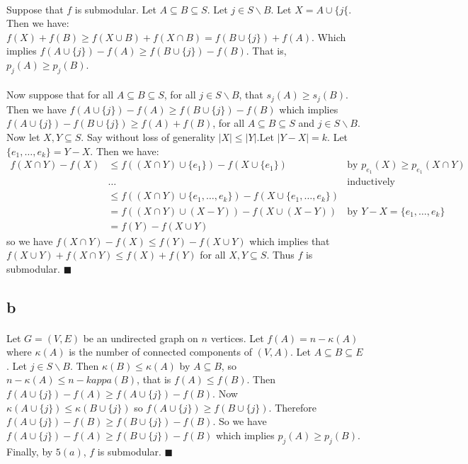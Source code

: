 \documentclass[letterpaper,12pt,oneside,onecolumn]{report}
\begin{document}
\paragraph{}
Suppose that $f$ is submodular. Let $A \subseteq B \subseteq S$. Let $j \in S \backslash B$. Let $X = A \cup \{j \{$. Then we have: $f(X) + f(B) \geq f(X \cup B) + f(X \cap B) = f(B \cup \{j\}) + f(A)$. Which implies $f(A \cup \{j\}) - f(A) \geq f(B \cup \{j\}) - f(B)$. That is, $p_j(A) \geq p_j(B)$.
\paragraph{}
Now suppose that for all $A \subseteq B \subseteq S$, for all $j \in S \backslash B$, that $s_j(A) \geq s_j(B)$. Then we have $f(A \cup \{j\}) - f(A) \geq f(B \cup \{j\}) - f(B)$ which implies $f(A \cup \{j\}) - f(B \cup \{j\}) \geq f(A) + f(B)$, for all $A \subseteq B \subseteq S$ and $j \in S \backslash B$. Now let $X, Y \subseteq S$. Say without loss of generality $|X| \leq |Y|$.Let $|Y - X| = k$. Let $\{e_1, \dots, e_k\} = Y-X$. Then we have:
\begin{align*}
f(X \cap Y) - f(X) &\leq f((X \cap Y) \cup \{e_1\}) - f(X \cup \{e_1\}) &\text{by $p_{e_1}(X) \geq p_{e_1}(X\cap Y)$} \\
& \dots &\text{inductively} \\
&\leq f((X\cap Y) \cup \{e_1, \dots, e_k\}) - f(X \cup \{e_1, \dots, e_k\}) \\
&= f((X \cap Y) \cup (X - Y)) - f(X \cup (X - Y))  &\text{by $Y-X = \{e_1, \dots, e_k\}$}\\
&= f(Y) - f(X \cup Y)
\end{align*}  
so we have $f(X \cap Y) - f(X) \leq f(Y) - f(X \cup Y)$ which implies that $f(X \cup Y) + f(X \cap Y) \leq f(X) + f(Y)$ for all $X,Y \subseteq S$. Thus $f$ is submodular. $\blacksquare$
\subsection*{b}
\paragraph{}
Let $G = (V,E)$ be an undirected graph on $n$ vertices. Let $f(A) = n - \kappa(A)$ where $\kappa(A)$ is the number of connected components of $(V,A)$. Let $A \subseteq B \subseteq E$. Let $j \in S \backslash B$. Then $\kappa(B) \leq \kappa(A)$ by $A \subseteq B$, so $n - \kappa(A) \leq n - kappa(B)$, that is $f(A) \leq f(B)$. Then $f(A \cup \{j\}) - f(A) \geq f(A \cup \{j\}) - f(B)$. Now $\kappa(A \cup \{j\}) \leq \kappa(B \cup \{j\})$ so $f(A\cup \{j\}) \geq f(B \cup \{j\})$. Therefore $f(A \cup \{j\}) - f(B) \geq f(B \cup \{j\}) - f(B)$. So we have $f(A \cup \{j\}) - f(A) \geq f(B \cup \{j\}) - f(B)$ which implies $p_j(A) \geq p_j(B)$. Finally, by $5(a)$, $f$ is submodular. $\blacksquare$ 
\end{document}
